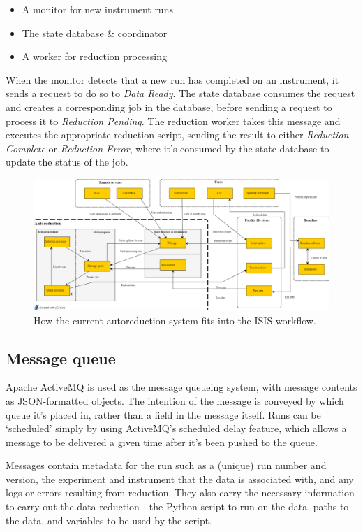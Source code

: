 \documentclass[twocolumn]{article}
\begin{document}
\begin{itemize}[noitemsep]
\item
  A monitor for new instrument runs
\item
  The state database \& coordinator
\item
  A worker for reduction processing
\end{itemize}

When the monitor detects that a new run has completed on an instrument, it sends a
request to do so to \emph{Data Ready}. The state database consumes the
request and creates a corresponding job in the database, before
sending a request to process it to \emph{Reduction Pending}. The reduction
worker takes this message and executes the appropriate reduction script, sending the
result to either \emph{Reduction Complete} or \emph{Reduction Error},
where it's consumed by the state database to update the status of the
job.

\begin{figure}
\centering\includegraphics[width=1.15\linewidth,angle=90,origin=c]{system.png}
\caption{How the current autoreduction system fits into the ISIS workflow.}
\end{figure}

\subsection{Message queue}\label{message-queue}

Apache ActiveMQ\cite{activemq} is used as the message queueing system, with
message contents as JSON-formatted objects. The intention of the message
is conveyed by which queue it's placed in, rather than a field in the
message itself. Runs can be `scheduled' simply by using ActiveMQ's
scheduled delay feature, which allows a message to be delivered a given
time after it's been pushed to the queue.

Messages contain metadata for the run such as a (unique) run number and
version, the experiment and instrument that the data is associated with,
and any logs or errors resulting from reduction. They also carry the
necessary information to carry out the data reduction - the Python
script to run on the data, paths to the data, and variables to be used
by the script.
\end{document}

